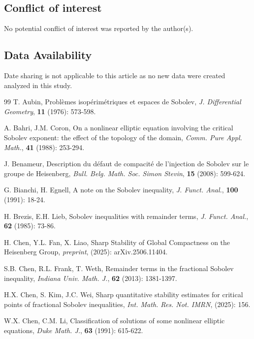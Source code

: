 \documentclass[11pt]{article}
\begin{document}
\subsection*{Conflict of interest}

 No potential conflict of interest was reported by the author(s).


\subsection*{Data Availability}

Date sharing is not applicable to this article as no new data were created analyzed in this study.


%

\begin{thebibliography}{99}
 T. Aubin,
Probl\`{e}mes isop\'{e}rim\'{e}triques et espaces de Sobolev,
{\em J. Differential Geometry}, {\bf 11} (1976): 573-598.

 A. Bahri, J.M. Coron,
On a nonlinear elliptic equation involving the critical Sobolev
exponent: the effect of the topology of the domain,
{\em Comm. Pure Appl. Math.}, {\bf 41} (1988): 253-294.

 J. Benameur, Description du d\'{e}faut de compacit{\'{e}} de l'injection de Sobolev sur le groupe de Heisenberg,
    {\em Bull. Belg. Math. Soc.
Simon Stevin}, {\bf 15} (2008): 599-624.

 G. Bianchi, H. Egnell,
A note on the Sobolev inequality,
{\em J. Funct. Anal.}, {\bf 100} (1991): 18-24.

 H. Brezis, E.H. Lieb,
Sobolev inequalities with remainder terms,
{\em J. Funct. Anal.}, {\bf 62} (1985): 73-86.

 H. Chen, Y.L. Fan, X. Liao,
Sharp Stability of Global Compactness on the Heisenberg Group,
{\em preprint}, (2025): arXiv.2506.11404.

 S.B. Chen, R.L. Frank, T. Weth,
Remainder terms in the fractional Sobolev inequality,
{\em Indiana Univ. Math. J.}, {\bf 62} (2013): 1381-1397.

 H.X. Chen, S. Kim, J.C. Wei,
Sharp quantitative stability estimates for critical points of fractional Sobolev inequalities,
{\em Int. Math. Res. Not. IMRN},  (2025): 156.

 W.X. Chen, C.M. Li,
Classification of solutions of some nonlinear elliptic equations, {\em Duke Math. J.}, {\bf 63} (1991): 615-622.


\end{thebibliography}
\end{document}
